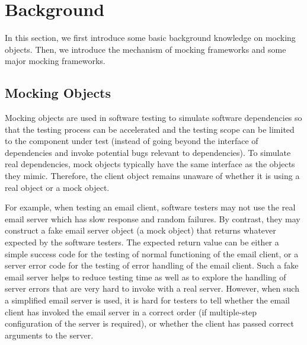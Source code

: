 \section{Background}
\label{sec:backgroundmock}
In this section, we first introduce some basic background knowledge on mocking objects. Then, we introduce the mechanism of mocking frameworks and some major mocking frameworks.
\subsection{Mocking Objects}

Mocking objects are used in software testing to simulate software dependencies so that the testing process can be accelerated and the testing scope can be limited to the component under test (instead of going beyond the interface of dependencies and invoke potential bugs relevant to dependencies). To simulate real dependencies, mock objects typically have the same interface as the objects they mimic. Therefore, the client object remains unaware of whether it is using a real object or a mock object. 


For example, when testing an email client, software testers may not use the real email server which has slow response and random failures. By contrast, they may construct a fake email server object (a mock object) that returns whatever expected by the software testers. The expected return value can be either a simple success code for the testing of normal functioning of the email client, or a server error code for the testing of error handling of the email client. Such a fake email server helps to reduce testing time as well as to explore the handling of server errors that are very hard to invoke with a real server. However, when such a simplified email server is used, it is hard for testers to tell whether the email client has invoked the email server in a correct order (if multiple-step configuration of the server is required), or whether the client has passed correct arguments to the server. 

